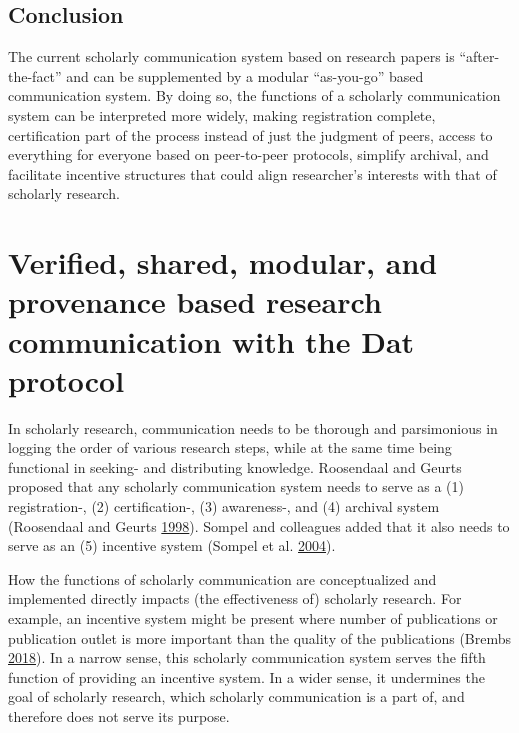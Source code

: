 \documentclass[a5paper]{book}
\begin{document}
\section{Conclusion}\label{conclusion-1}

The current scholarly communication system based on research papers is
\enquote{after-the-fact} and can be supplemented by a modular
\enquote{as-you-go} based communication system. By doing so, the
functions of a scholarly communication system can be interpreted more
widely, making registration complete, certification part of the process
instead of just the judgment of peers, access to everything for everyone
based on peer-to-peer protocols, simplify archival, and facilitate
incentive structures that could align researcher's interests with that
of scholarly research.

\chapter{Verified, shared, modular, and provenance based research
communication with the Dat
protocol}\label{verified-shared-modular-and-provenance-based-research-communication-with-the-dat-protocol}

In scholarly research, communication needs to be thorough and
parsimonious in logging the order of various research steps, while at
the same time being functional in seeking- and distributing knowledge.
Roosendaal and Geurts proposed that any scholarly communication system
needs to serve as a (1) registration-, (2) certification-, (3)
awareness-, and (4) archival system (Roosendaal and Geurts
\protect\hyperlink{ref-roosendaal1998}{1998}). Sompel and colleagues
added that it also needs to serve as an (5) incentive system (Sompel et
al.
\protect\hyperlink{ref-doi:10.1045ux2fseptember2004-vandesompel}{2004}).

How the functions of scholarly communication are conceptualized and
implemented directly impacts (the effectiveness of) scholarly research.
For example, an incentive system might be present where number of
publications or publication outlet is more important than the quality of
the publications (Brembs
\protect\hyperlink{ref-doi:10.3389ux2ffnhum.2018.00037}{2018}). In a
narrow sense, this scholarly communication system serves the fifth
function of providing an incentive system. In a wider sense, it
undermines the goal of scholarly research, which scholarly communication
is a part of, and therefore does not serve its purpose.
\end{document}
